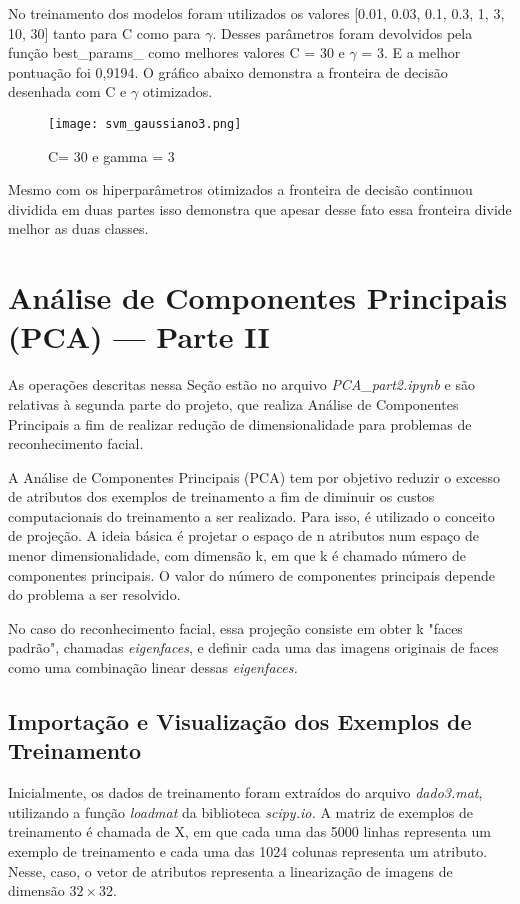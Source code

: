 \documentclass[12pt]{article}
\begin{document}
No treinamento dos modelos foram utilizados os valores [0.01, 0.03, 0.1, 0.3, 1, 3, 10, 30] tanto para C como para $\gamma$. Desses parâmetros foram devolvidos pela função best\_params\_ como melhores valores C = 30 e $\gamma$ = 3. E a melhor pontuação foi 0,9194. O gráfico abaixo demonstra a fronteira de decisão desenhada com C e $\gamma$ otimizados. 

\begin{figure} [htp]
\begin{center}
\texttt{[image: svm\_gaussiano3.png]}
\caption{C= 30 e gamma = 3} \label{svm_gaussiano_3}
\end{center}
\end{figure}

Mesmo com os hiperparâmetros otimizados a fronteira de decisão continuou dividida em duas partes isso demonstra que apesar desse fato essa fronteira divide melhor as duas classes. 

\section{Análise de Componentes Principais (PCA) --- Parte II} \label{parte2}
As operações descritas nessa Seção estão no arquivo \textit{PCA\_part2.ipynb} e são relativas à segunda parte do projeto, que realiza Análise de Componentes Principais a fim de realizar redução de dimensionalidade para problemas de reconhecimento facial.

A Análise de Componentes Principais (PCA) tem por objetivo reduzir o excesso de atributos dos exemplos de treinamento a fim de diminuir os custos computacionais do treinamento a ser realizado. Para isso, é utilizado o conceito de projeção. A ideia básica é projetar o espaço de n atributos num espaço de menor dimensionalidade, com dimensão k, em que k é chamado número de componentes principais. O valor do número de componentes principais depende do problema a ser resolvido.

No caso do reconhecimento facial, essa projeção consiste em obter k "faces padrão", chamadas \textit{eigenfaces}, e definir cada uma das imagens originais de faces como uma combinação linear dessas \textit{eigenfaces.}

\subsection{Importação e Visualização dos Exemplos de Treinamento} 
Inicialmente, os dados de treinamento foram extraídos do arquivo \textit{dado3.mat}, utilizando a função \textit{loadmat} da biblioteca \textit{scipy.io.} A matriz de exemplos de treinamento é chamada de X, em que cada uma das 5000 linhas representa um exemplo de treinamento e cada uma das 1024 colunas representa um atributo. Nesse, caso, o vetor de atributos representa a linearização de imagens de dimensão $32 \times 32$.
\end{document}
